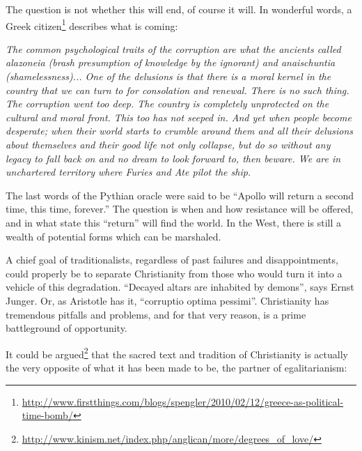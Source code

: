 The question is not whether this will end, of course it will. In wonderful words, a Greek citizen\footnote{\url{http://www.firstthings.com/blogs/spengler/2010/02/12/greece-as-political-time-bomb/}} describes what is coming:

\begin{quotex}
\emph{The common psychological traits of the corruption are what the ancients called alazoneia (brash presumption of knowledge by the ignorant) and anaischuntia (shamelessness)... One of the delusions is that there is a moral kernel in the country that we can turn to for consolation and renewal. There is no such thing. The corruption went too deep. The country is completely unprotected on the cultural and moral front. This too has not seeped in. And yet when people become desperate; when their world starts to crumble around them and all their delusions about themselves and their good life not only collapse, but do so without any legacy to fall back on and no dream to look forward to, then beware. We are in unchartered territory where Furies and Ate pilot the ship.}
\end{quotex}


The last words of the Pythian oracle were said to be ``Apollo will return a second time, this time, forever.'' The question is when and how resistance will be offered, and in what state this ``return'' will find the world. In the West, there is still a wealth of potential forms which can be marshaled.

A chief goal of traditionalists, regardless of past failures and disappointments, could properly be to separate Christianity from those who would turn it into a vehicle of this degradation. ``Decayed altars are inhabited by demons'', says Ernst Junger. Or, as Aristotle has it, ``corruptio optima pessimi''. Christianity has tremendous pitfalls and problems, and for that very reason, is a prime battleground of opportunity.

It could be argued\footnote{\url{http://www.kinism.net/index.php/anglican/more/degrees\_of\_love/}} that the sacred text and tradition of Christianity is actually the very opposite of what it has been made to be, the partner of egalitarianism:

